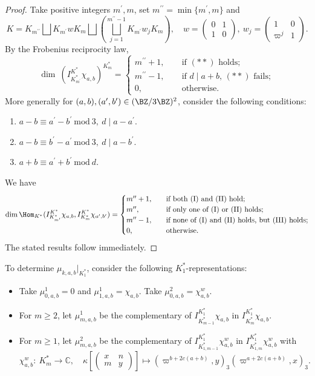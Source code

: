 \documentclass[11pt,reqno]{amsart}
\newcommand{\BC}{{\mathbb {C}}} \newcommand{\BD}{{\mathbb {D}}}
\renewcommand{\mod}{\ \mathrm{mod}\ }\renewcommand{\Re}{{\mathrm{Re}}}
\newcommand{\lra}{\longrightarrow}\newcommand{\lla}{\longleftarrow}
\theoremstyle{plain}
\theoremstyle{remark} \newtheorem{remark}[thm]{Remark}
\theoremstyle{definition} \newtheorem{exercise}[thm]{Exercise}
\theoremstyle{definition} \newtheorem{example}[thm]{Example} \newtheorem{condition}[thm]{Condition}
\numberwithin{equation}{section}
\renewcommand{\-}{\text{--}}
\begin{document}
\begin{proof}Take positive integers $m^\prime,m$, set $m^{\prime\prime}=\min\{m^\prime,m\}$ and 
\[K=K_{m^{\prime\prime}}\bigsqcup K_{m^\prime} w K_m \bigsqcup \left(\bigsqcup_{j=1}^{m^{\prime\prime}-1} K_{m^\prime} w_j K_m\right),\quad w=\begin{pmatrix} 0 & 1\\ 1 & 0\end{pmatrix},\ w_j=\begin{pmatrix}1 & 0\\ \varpi^j & 1\end{pmatrix}.\]
By the Frobenius reciprocity law, 
\[\dim\ (I_{K_{m^\prime}^*}^{K^*}\chi_{a,b})^{K_m^*}=\begin{cases} m^{\prime\prime}+1,\quad &\ \text{if $(**)$ holds}; \\
m^{\prime\prime}-1,\quad &\ \text{if $d\mid a+b$, $(**)$ fails};\\ 
0,\quad &\  \text{otherwise}.\end{cases}\]
More generally for $(a,b),(a^\prime,b^\prime)\in(\BZ/3\BZ)^2$, consider 
the following conditions:
\begin{enumerate}
\item[(I)] $a-b\equiv a^\prime-b^\prime \mod 3,\ d\mid a-a^\prime$.
\item[(II)] $a-b\equiv b^\prime-a^\prime \mod 3,\ d\mid a-b^\prime$.
\item[(III)] $a+b\equiv a^\prime+b^\prime \mod d$.
\end{enumerate}
We have
\[\dim \Hom_{K^*}(I_{K_{m^\prime}^*}^{K^*}\chi_{a,b}, I_{K_m^*}^{K^*}\chi_{a^\prime,b^\prime})=\begin{cases} m^{\prime\prime}+1,\quad & \text{if both (I) and (II) hold};\\
m^{\prime\prime},\quad & \text{if only one of  (I) or (II) holds};  \\
m^{\prime\prime}-1,\quad &  
\text{if none of  (I) and (II) holds, but (III) holds};  \\
0, \quad &\text{otherwise.}\end{cases}\]
The stated results follow immediately.
\end{proof}
To determine $\mu_{k,a,b}|_{K_1^*}$, consider the following $K_1^*$-representations:
\begin{itemize}
\item Take $\mu_{0,a,b}^1=0$ and $\mu_{1,a,b}^1=\chi_{a,b}$. Take $\mu_{0,a,b}^2=\chi_{a,b}^w$.
\item For $m\geq2$, let $\mu_{m,a,b}^1$ be the complementary of $I_{K_{m-1}^*}^{K_1^*}\chi_{a,b}$ in $I_{K_{m}^*}^{K_1^*}\chi_{a,b}$.  
\item  For $m\geq1$, let $\mu_{m,a,b}^2$ be the complementary of $I_{K_{1,m-1}^*}^{K_1^*}\chi^w_{a,b}$ in $I_{K_{1,m}^*}^{K_1^*}\chi^w_{a,b}$ with \[\chi_{a,b}^w:\ K_m^*\lra \BC,\quad \kappa\left[\begin{pmatrix} x & n \\ m & y\end{pmatrix}\right]
\mapsto (\varpi^{b+2c(a+b)}, y)_3(\varpi^{a+2c(a+b)},x)_3.\]
 
\end{itemize}
\end{document}
